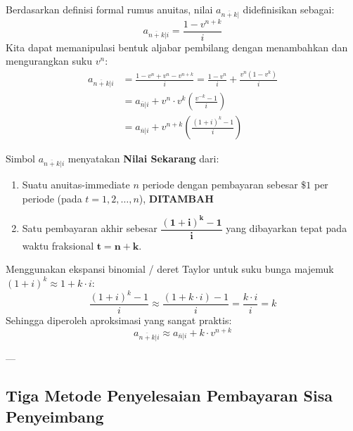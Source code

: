 \documentclass[11pt,a4paper]{article}
\begin{document}
Berdasarkan definisi formal rumus anuitas, nilai $a_{\overline{n+k}|}$ didefinisikan sebagai:
\begin{equation}
    a_{\overline{n+k}|i} = \frac{1 - v^{n+k}}{i}
\end{equation}
Kita dapat memanipulasi bentuk aljabar pembilang dengan menambahkan dan mengurangkan suku $v^n$:
\begin{align}
    a_{\overline{n+k}|i} &= \frac{1 - v^n + v^n - v^{n+k}}{i} = \frac{1 - v^n}{i} + \frac{v^n(1 - v^k)}{i} \nonumber\\[0.4em]
    &= a_{\overline{n}|i} + v^n \cdot v^k \left( \frac{v^{-k} - 1}{i} \right) \nonumber\\[0.4em]
    &= a_{\overline{n}|i} + v^{n+k} \left( \frac{(1+i)^k - 1}{i} \right)
\end{align}

\begin{definitionbox}
Simbol $a_{\overline{n+k}|i}$ menyatakan \textbf{Nilai Sekarang} dari:
\begin{enumerate}
    \item Suatu anuitas-immediate $n$ periode dengan pembayaran sebesar $\$1$ per periode (pada $t = 1, 2, \dots, n$), \textbf{DITAMBAH}
    \item Satu pembayaran akhir sebesar $\mathbf{\dfrac{(1+i)^k - 1}{i}}$ yang dibayarkan tepat pada waktu fraksional $\mathbf{t = n + k}$.
\end{enumerate}
\end{definitionbox}

\begin{notebox}
Menggunakan ekspansi binomial / deret Taylor untuk suku bunga majemuk $(1+i)^k \approx 1 + k \cdot i$:
\begin{equation}
    \frac{(1+i)^k - 1}{i} \approx \frac{(1 + k \cdot i) - 1}{i} = \frac{k \cdot i}{i} = k
\end{equation}
Sehingga diperoleh aproksimasi yang sangat praktis:
\begin{equation}
    a_{\overline{n+k}|i} \approx a_{\overline{n}|i} + k \cdot v^{n+k}
\end{equation}
\end{notebox}

---

\subsection{Tiga Metode Penyelesaian Pembayaran Sisa Penyeimbang}
\end{document}
